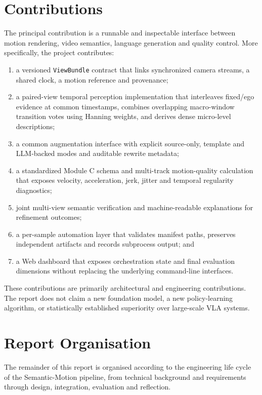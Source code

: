 \documentclass[11pt,oneside]{report}
\begin{document}
\section{Contributions}
The principal contribution is a runnable and inspectable interface between
motion rendering, video semantics, language generation and quality control.
More specifically, the project contributes:

\begin{enumerate}
    \item a versioned \texttt{ViewBundle} contract that links synchronized
    camera streams, a shared clock, a motion reference and provenance;
    \item a paired-view temporal perception implementation that interleaves
    fixed/ego evidence at common timestamps, combines overlapping macro-window
    transition votes using Hanning weights, and derives dense micro-level
    descriptions;
    \item a common augmentation interface with explicit source-only, template
    and LLM-backed modes and auditable rewrite metadata;
    \item a standardized Module C schema and multi-track motion-quality
    calculation that exposes velocity, acceleration, jerk, jitter and temporal
    regularity diagnostics;
    \item joint multi-view semantic verification and machine-readable
    explanations for refinement outcomes;
    \item a per-sample automation layer that validates manifest paths, preserves
    independent artifacts and records subprocess output; and
    \item a Web dashboard that exposes orchestration state and final evaluation
    dimensions without replacing the underlying command-line interfaces.
\end{enumerate}

These contributions are primarily architectural and engineering contributions.
The report does not claim a new foundation model, a new policy-learning
algorithm, or statistically established superiority over large-scale VLA
systems.

\section{Report Organisation}
The remainder of this report is organised according to the engineering life cycle of the Semantic-Motion pipeline, from technical background and requirements through design, integration, evaluation and reflection.
\end{document}
